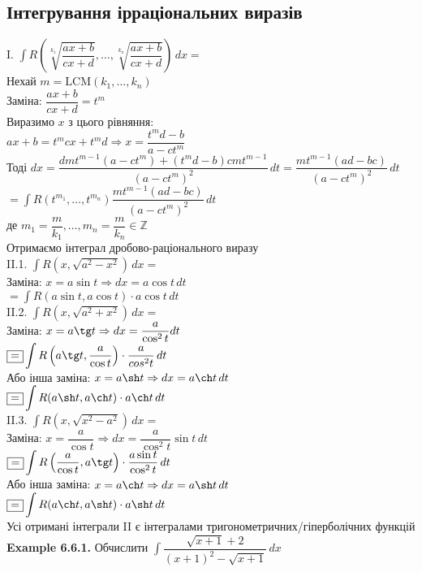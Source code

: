 \documentclass[a4paper, 14pt]{extarticle}
\def\huge{\displaystyle}
\def\bigline{\vspace{5mm}\\}
\def\ex#1{\textbf{Example {#1}}}
\def\bigline{\vspace{5mm}\\}
\begin{document}
\subsection{Інтегрування ірраціональних виразів}
I. $\huge \int R\left( \sqrt[k_1]{\dfrac{ax+b}{cx+d}}, \dots, \sqrt[k_n]{\dfrac{ax+b}{cx+d}} \right)\,dx \boxed{=}$\\
Нехай $m = \textrm{LCM} (k_1,\dots,k_n)$\\
Заміна: $\dfrac{ax+b}{cx+d} = t^m$\\
Виразимо $x$ з цього рівняння:\\
$ax+b =t^m cx + t^m d \Rightarrow x = \dfrac{t^md-b}{a-ct^m}$\\
Тоді $dx = \dfrac{dmt^{m-1}(a-ct^m) + (t^md-b)cmt^{m-1}}{(a-ct^m)^2}\,dt = \dfrac{mt^{m-1}(ad-bc)}{(a-ct^m)^2}\,dt$\\
$\huge \boxed{=} \int R(t^{m_1},\dots,t^{m_n}) \dfrac{mt^{m-1}(ad-bc)}{(a-ct^m)^2}\,dt$\\
де $m_1 = \dfrac{m}{k_1},\dots,m_n = \dfrac{m}{k_n} \in \mathbb{Z}$\\
Отримаємо інтеграл дробово-раціонального виразу
\bigline
II.1. $\huge \int R(x,\sqrt{a^2-x^2})\,dx \boxed{=}$\\
Заміна: $x = a\sin t \Rightarrow dx = a\cos t \,dt$\\
$\boxed{=} \huge \int R(a\sin t, a\cos t) \cdot a\cos t \,dt$
\bigline
II.2. $\huge \int R(x,\sqrt{a^2+x^2})\,dx \boxed{=}$\\
Заміна: $x = a\tg t \Rightarrow dx = \dfrac{a}{\cos^2 t} dt$\\
$\boxed{=} \huge \int R\left(a\tg t, \dfrac{a}{\cos t}\right) \cdot \dfrac{a}{cos^2 t} \,dt$
\bigline
Або інша заміна: $x = a \sh t \Rightarrow dx = a \ch t \,dt$\\
$\boxed{=} \huge \int R(a\sh t, a \ch t) \cdot a \ch t\,dt$
\bigline
II.3. $\huge \int R(x, \sqrt{x^2-a^2})\,dx \boxed{=}$\\
Заміна: $x = \dfrac{a}{\cos t} \Rightarrow dx = \dfrac{a}{\cos^2 t} \sin t\,dt$\\
$\boxed{=} \huge \int R \left(\dfrac{a}{\cos t}, a \tg t \right) \cdot \dfrac{a \sin t}{\cos ^2 t}\,dt$
\bigline
Або інша заміна: $x = a \ch t \Rightarrow dx = a \sh t \,dt$\\
$\boxed{=} \huge \int R(a \ch t, a \sh t) \cdot a \sh t \,dt$
\bigline
Усі отримані інтеграли II є інтегралами тригонометричних/гіперболічних функцій
\bigline
\ex{6.6.1.} Обчислити $\huge \int \dfrac{\sqrt{x+1}+2}{(x+1)^2 - \sqrt{x+1}}\,dx$\\
\end{document}
